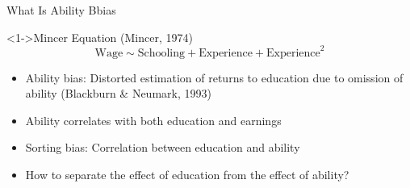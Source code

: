 \documentclass{beamer} %
\begin{document}
\begin{frame}{What Is Ability Bbias}

    \begin{block}<1->{Mincer Equation (Mincer, 1974)}
        \large
        \begin{equation*}
            \text{Wage} \sim \text{Schooling} + \text{Experience} + \text{Experience}^2
        \end{equation*}
    \end{block}

    \begin{itemize}
        \item<2-> Ability bias: Distorted estimation of returns to education due to omission of ability (Blackburn \& Neumark, 1993)
        \item<3-> Ability correlates with both education and earnings
        \item<4-> Sorting bias: Correlation between education and ability
        \item<5-> How to separate the effect of education from the effect of ability?
    \end{itemize}

\end{frame}
\end{document}
